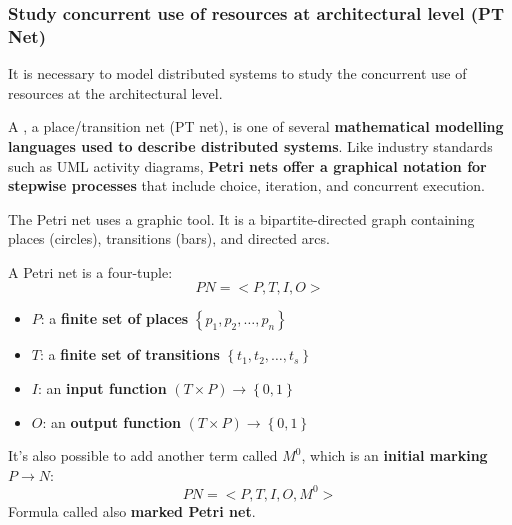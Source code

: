 \subsubsection{Study concurrent use of resources at architectural level (PT Net)}

It is necessary to model distributed systems to study the concurrent use of resources at the architectural level.

\highspace
A , a place/transition net (PT net), is one of several \textbf{mathematical modelling languages used to describe distributed systems}. Like industry standards such as UML activity diagrams, \textbf{Petri nets offer a graphical notation for stepwise processes} that include choice, iteration, and concurrent execution.

\highspace
The Petri net uses a graphic tool. It is a bipartite-directed graph containing places (circles), transitions (bars), and directed arcs.

\highspace
A Petri net is a four-tuple:
\begin{equation}
    PN = <P, T, I, O>
\end{equation}
\begin{itemize}
    \item $P$: a \textbf{finite set of places} $\left\{p_{1}, p_{2}, \dots, p_{n}\right\}$
    
    \item $T$: a \textbf{finite set of transitions} $\left\{t_{1}, t_{2}, \dots, t_{s}\right\}$
    
    \item $I$: an \textbf{input function} $\left(T \times P\right) \longrightarrow \left\{0,1\right\}$
    
    \item $O$: an \textbf{output function} $\left(T \times P\right) \longrightarrow \left\{0,1\right\}$
\end{itemize}
It's also possible to add another term called $M^{0}$, which is an \textbf{initial marking} $P \longrightarrow N$:
\begin{equation}
    PN = <P, T, I, O, M^{0}>
\end{equation}
Formula called also \textbf{marked Petri net}.

